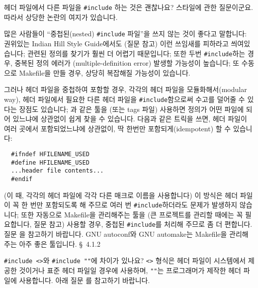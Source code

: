 \begin{faq}
	헤더 파일에서 다른 파일을 \verb+#include+ 하는 것은
	괜찮나요?
\A
	스타일에 관한 질문이군요.  따라서 상당한 논란의 여지가 있습니다.

	많은 사람들이 ``중첩된(nested) \verb+#include+ 파일''을 쓰지
	않는 것이 좋다고 말합니다: 권위있는 Indian Hill Style Guide에서도
        (질문  참고) 이런 쓰임새를 피하라고 씌여있습니다;
	관련된 정의를 찾기가 훨씬 더 어렵기 때문입니다; 또한 두번
	\verb+#include+하는 경우, 중복된 정의 에러가 (multiple-definition
        error) 발생할 가능성이 높습니다; 또 수동으로 Makefile을
	만들 경우, 상당히 복잡해질 가능성이 있습니다.

	그러나 헤더 파일을 중첩하여 포함할 경우, 각각의 헤더 파일을
	모듈화해서(modular way), 헤더 파일에서 필요한 다른
	헤더 파일을 \verb+#include+함으로써 수고를 덜어줄 수 있다는
	장점도 있습니다; 과 같은 툴을 (또는 tags 파일) 사용하면
	정의가 어떤 파일에 되어 있느냐에 상관없이 쉽게 찾을 수 있습니다.
	다음과 같은 트릭을 쓰면, 헤더 파일이 여러 곳에서 포함되었느냐에
        상관없이, 딱 한번만 포함되게(idempotent) 할 수 있습니다:

\begin{verbatim}
  #ifndef HFILENAME_USED
  #define HFILENAME_USED
  ...header file contents...
  #endif
\end{verbatim}

	\noindent (이 때, 각각의 헤더 파일에 각각 다른 매크로 이름을
	사용합니다) 이 방식은 헤더 파일이 꼭 한 번만 포함되도록 해 주므로
	여러 번 \verb+#include+하더라도 문제가 발생하지 않습니다; 또한
	자동으로 Makefile을 관리해주는 툴을 (큰 프로젝트를 관리할 때에는
	꼭 필요합니다, 질문  참고) 사용할 경우, 중첩된 \verb+#include+를
	처리해 주므로 좀 더 편합니다.  질문 을 참고하기 바랍니다.
\T
	GNU autoconf와 GNU automake는 Makefile을 관리해주는 아주 좋은 툴입니다.
\R
	\cite{rationale} \S\ 4.1.2
\end{faq}

\begin{faq}
	\verb+#include <>+와 \verb+#include ""+에 차이가 있나요?
\A
	\verb+<>+ 형식은 헤더 파일이 시스템에서 제공한 것이거나
	표준 헤더 파일일 경우에 사용하며, \verb+""+는 프로그래머가 제작한
	헤더 파일에 사용합니다.
\T
	아래 질문 를 참고하기 바랍니다.

\end{faq}

